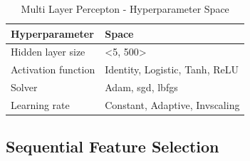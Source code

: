 \begin{table}[H]
\small
\setlength{\tabcolsep}{8pt}
\renewcommand{\arraystretch}{1.3}
\centering
    \caption[Multi Layer Percepton - Hyperparameter Space]{Multi Layer Percepton - Hyperparameter Space}\label{tab:mlpspace}
    \begin{tabular}{ll}
\toprule
\textbf{Hyperparameter} & \textbf{Space}\\
\midrule
\hline
Hidden layer size & <5, 500> \\
Activation function & Identity, Logistic, Tanh, ReLU \\
Solver & Adam, sgd, lbfgs \\
Learning rate & Constant, Adaptive, Invscaling \\
\hline
\bottomrule
\end{tabular}
\vspace{0.7em}

\vspace{-1em}
\end{table}

\newpage
\subsection{Sequential Feature Selection}
\label{subsec:feature-selection}

